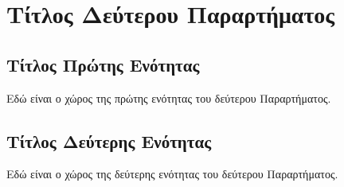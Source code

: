 \chapter{Τίτλος Δεύτερου Παραρτήματος}
\label{app:SecondAppendix}

\section{Τίτλος Πρώτης Ενότητας}
\label{sec:FirstSection}
Εδώ είναι ο χώρος της πρώτης ενότητας του δεύτερου Παραρτήματος.

\section{Τίτλος Δεύτερης Ενότητας}
\label{sec:SecondSection}
Εδώ είναι ο χώρος της δεύτερης ενότητας του δεύτερου Παραρτήματος.
